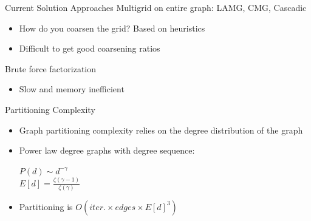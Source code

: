 \documentclass[xcolor=dvipsnames,10pt]{beamer}
\begin{document}

\begin{frame}{Current Solution Approaches}
\large
Multigrid on entire graph: LAMG, CMG, Cascadic
\vspace{.2in}
\begin{itemize}
\item 

How do you coarsen the grid? Based on heuristics
\vspace{.15in}
\item
Difficult to get good coarsening ratios

\medskip
\end{itemize}
\vspace{.4in}
\large
Brute force factorization

\vspace{.2in}
\medskip
\begin{itemize}

\item Slow and memory inefficient

\end{itemize}
\normalsize

\end{frame}

\begin{frame}{Partitioning Complexity}
\begin{itemize}
\large
\item
Graph partitioning complexity relies on the degree distribution of the graph
\item
Power law degree graphs with degree sequence:
\begin{center}
\Large
\vspace{.15in}
$P(d) \sim d^{-\gamma}$\\
\vspace{.15in}
$E[d] = \frac{\zeta(\gamma - 1)}{\zeta(\gamma)}$
\end{center}
\vspace{.15in}
\large
\item
Partitioning is $O(iter. \times edges \times E[d]^3)$
\end{itemize}
\end{frame}

\end{document}
